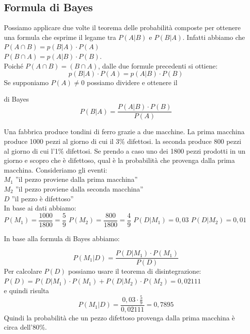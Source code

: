 \subsection{Formula di Bayes}
Possiamo applicare due volte il teorema delle probabilità composte per 
ottenere 
una formula che esprime il legame tra \(P(A|B)\) e \(P(B|A)\).
Infatti abbiamo che \\
\(P(A\cap B)=p(B|A)\cdot P(A)\) \\
\(P(B\cap A)=p(A|B)\cdot P(B)\).\\
Poiché \(P(A\cap B) = (B\cap A)\), dalle due formule precedenti si ottiene:
\[p(B|A)\cdot P(A) = p(A|B)\cdot P(B)\]
Se supponiamo \(P(A) \neq 0\) possiamo dividere e ottenere il
\begin{teorema}{di Bayes}
\[P(B|A)=\dfrac{P(A|B)\cdot P(B)}{P(A)}\] 
\end{teorema} 


\begin{esempio}
Una fabbrica produce tondini di ferro grazie a due macchine. La prima 
macchina 
produce 1000 pezzi al giorno di cui il 3\% difettosi. la seconda produce 800 
pezzi al giorno di cui l'1\% difettosi. Se prendo a caso uno dei 1800 pezzi 
prodotti in un giorno e scopro che è difettoso, qual è la probabilità che 
provenga dalla prima macchina.
Consideriamo gli eventi:\\
\(M_1\) ''il pezzo proviene dalla prima macchina''\\
\(M_2\) ''il pezzo proviene dalla seconda macchina''\\
\(D\) ''il pezzo è difettoso''\\
In base ai dati abbiamo:\\
\(P(M_1)=\dfrac{1000}{1800}=\dfrac{5}{9}\)
\(P(M_2)=\dfrac{800}{1800}=\dfrac{4}{9}\)
\(P(D|M_1)=0,03\)
\(P(D|M_2)=0,01\)
\end{esempio}

In base alla formula di Bayes abbiamo:

\[P(M_1|D)=\dfrac{P(D|M_1)\cdot P(M_1)}{P(D)}\]
Per calcolare \(P(D)\) possiamo usare il teorema di disintegrazione:\\
\(P(D)=P(D|M_1)\cdot P(M_1) + P(D|M_2)\cdot P(M_2)=0,02111\)\\
e quindi risulta 
\[P(M_1|D)=\dfrac{0,03 \cdot \frac{5}{9}}{0,02111}=0,7895\]
Quindi la probabilità che un pezzo difettoso provenga dalla prima macchina è 
circa dell'80\%.

